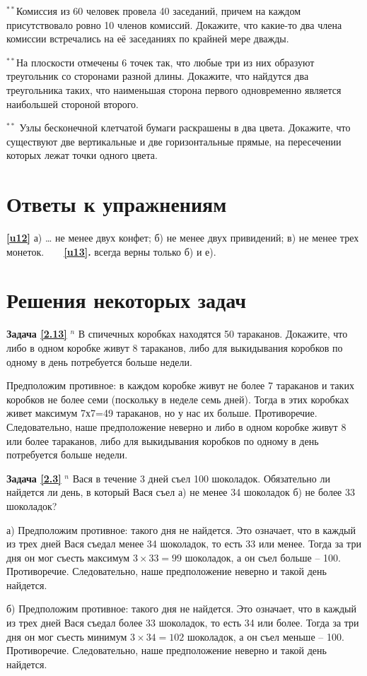 \begin{thm}
	$^{\ast\ast}$Комиссия из 60 человек провела 40 заседаний, причем на каждом присутствовало ровно 10 членов комиссий. Докажите, что какие-то два члена комиссии встречались на её заседаниях по крайней мере дважды.
\end{thm}

\begin{thm}
	$^{\ast\ast}$На плоскости отмечены 6 точек так, что любые три из них образуют треугольник со сторонами разной длины. Докажите, что найдутся два треугольника таких, что наименьшая сторона первого одновременно является наибольшей стороной второго.
\end{thm}

\begin{thm}
	$^{\ast\ast}$	Узлы бесконечной клетчатой бумаги раскрашены в два цвета. Докажите, что существуют две вертикальные и две горизонтальные прямые, на пересечении которых лежат точки одного цвета.
\end{thm}
\newpage

\section{Ответы к упражнениям} \textbf{\ref{u12}}	а) … не менее двух конфет; б) не менее двух привидений; в) не менее трех монеток.~~~~\textbf{\ref{u13}.}	всегда верны только б) и е).
\section{Решения некоторых задач}
\textbf{Задача \ref{2.13}}
	$^n$ В спичечных коробках находятся 50 тараканов. Докажите, что либо в одном коробке живут 8 тараканов, либо для выкидывания коробков по одному в день потребуется больше недели.

\begin{prf}
	Предположим противное: в каждом коробке живут не более 7 тараканов и таких коробков не более семи (поскольку в неделе семь дней). Тогда в этих коробках живет максимум 7х7=49 тараканов, но у нас их больше. Противоречие. Следовательно, наше предположение неверно и либо в одном коробке живут 8 или более тараканов, либо для выкидывания коробков по одному в день потребуется больше недели.
\end{prf}

\textbf{Задача \ref{2.3}}
	$^n$ Вася в течение 3 дней съел 100 шоколадок. Обязательно ли найдется ли день, в который Вася съел а) не менее 34 шоколадок б) не более 33 шоколадок?

\begin{prf}
	а) Предположим противное: такого дня не найдется. Это означает, что в каждый из трех дней Вася съедал менее 34 шоколадок, то есть 33 или менее. Тогда за три дня он мог съесть максимум $3\times33=99$ шоколадок, а он съел больше -- 100. Противоречие. Следовательно, наше предположение неверно и такой день найдется.
	
	б) Предположим противное: такого дня не найдется. Это означает, что в каждый из трех дней Вася съедал более 33 шоколадок, то есть 34 или более. Тогда за три дня он мог съесть минимум $3\times34=102$ шоколадок, а он съел меньше -- 100. Противоречие. Следовательно, наше предположение неверно и такой день найдется.
\end{prf}